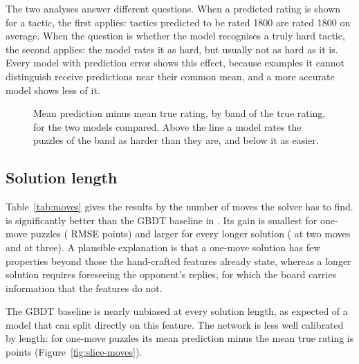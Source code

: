\documentclass[11pt]{article}
\begin{document}
The two analyses answer different questions. When a predicted rating is
shown for a tactic, the first applies: tactics predicted to be rated 1800
are rated 1800 on average. When the question is whether the model recognises
a truly hard tactic, the second applies: the model rates it as hard, but
usually not as hard as it is. Every model with prediction error shows this
effect, because examples it cannot distinguish receive predictions near
their common mean, and a more accurate model shows less of it.

\begin{figure}[htbp]\centering
{}
\caption{Mean prediction minus mean true rating, by band of the true rating,
for the two models compared. Above the line a model rates the puzzles of the
band as harder than they are, and below it as easier.}
\label{fig:band-bias}
\end{figure}

\subsection{Solution length}

Table~\ref{tab:moves} gives the results by the number of moves the solver has
to find.  is significantly better than the GBDT baseline
in . Its gain is smallest for one-move puzzles
( RMSE points) and larger for every longer solution
( at two moves and  at three). A
plausible explanation is that a one-move solution has few properties beyond
those the hand-crafted features already state, whereas a longer solution
requires foreseeing the opponent's replies, for which the board carries
information that the features do not.

\begin{table}[htbp]\centering\footnotesize
{}
\caption{Test-set results by solution length. For each group: the number of
test puzzles, the mean true rating, the mean prediction and RMSE of each of
the two models, and the paired gain of the first model over the second.}
\label{tab:moves}
\end{table}

The GBDT baseline is nearly unbiased at every solution length, as expected of
a model that can split directly on this feature. The network is less well
calibrated by length: for one-move puzzles its mean prediction minus the mean
true rating is  points
(Figure~\ref{fig:slice-moves}).
\end{document}
